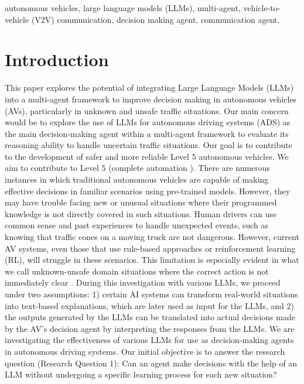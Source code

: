 \documentclass[conference]{IEEEtran}
\begin{document}
\begin{IEEEkeywords}
autonomous vehicles, large language models (LLMs), multi-agent, vehicle-to-vehicle (V2V) communication, decision making agent, communication agent.

\end{IEEEkeywords}

\IEEEpeerreviewmaketitle



\section{Introduction}

This paper explores the potential of integrating Large Language Models (LLMs)\cite{chang2024survey} into a multi-agent framework\cite{10707898} to improve decision making in autonomous vehicles (AVs), particularly in unknown and unsafe traffic situations.
Our main concern would be to explore the use of LLMs for autonomous driving systems (ADS) as the main decision-making agent within a multi-agent framework to evaluate its reasoning ability\cite{10707968} to handle uncertain traffic situations. Our goal is to contribute to the development of safer and more reliable Level 5\cite{cho2020more} autonomous vehicles. We aim to contribute to Level 5 (complete automation \cite{raza2018autonomous}). There are numerous instances in which traditional autonomous vehicles are capable of making effective decisions in familiar scenarios using pre-trained models.  However, they may have trouble facing new or unusual situations where their programmed knowledge is not directly covered in such situations. Human drivers can use common sense and past experiences to handle unexpected events, such as knowing that traffic cones on a moving truck are not dangerous. However, current AV systems, even those that use rule-based approaches or reinforcement learning (RL\cite{kaelbling1996reinforcement}), will struggle in these scenarios. This limitation is especially evident in what we call unknown-unsafe domain situations where the correct action is not immediately clear \cite{fu2024drive}.
During this investigation with various LLMs, we proceed under two assumptions: 1) certain AI systems can transform real-world situations into text-based explanations, which are later used as input for the LLMs, and 2) the outputs generated by the LLMs can be translated into actual decisions made by the AV’s decision agent by interpreting the responses from the LLMs. We are investigating the effectiveness of various LLMs for use as decision-making agents in autonomous driving systems. Our initial objective is to answer the research question (Research Question 1): Can an agent make decisions with the help of an LLM without undergoing a specific learning process for each new situation?
\end{document}
